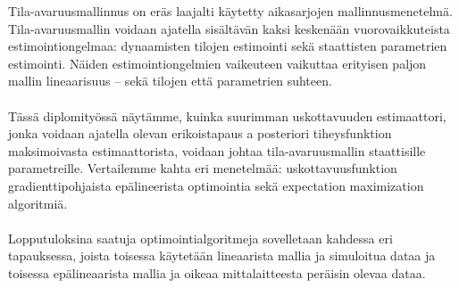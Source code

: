 \begin{abstractpage}[finnish]
Tila-avaruusmallinnus on eräs laajalti käytetty aikasarjojen mallinnusmenetelmä.
Tila-avaruusmallin voidaan ajatella sisältävän kaksi keskenään
vuorovaikkuteista estimointiongelmaa: dynaamisten tilojen estimointi
sekä staattisten parametrien estimointi. Näiden estimointiongelmien
vaikeuteen vaikuttaa erityisen paljon mallin lineaarisuus -- sekä
tilojen että parametrien suhteen.\\\\%
%
Tässä diplomityössä näytämme, kuinka 
suurimman uskottavuuden estimaattori, jonka voidaan ajatella olevan
erikoistapaus a posteriori tiheysfunktion maksimoivasta estimaattorista, 
voidaan johtaa tila-avaruusmallin staattisille parametreille.
Vertailemme kahta eri menetelmää: 
uskottavuusfunktion gradienttipohjaista epälineerista optimointia
sekä expectation maximization algoritmiä.\\\\%
%
Lopputuloksina saatuja optimointialgoritmeja sovelletaan kahdessa
eri tapauksessa, joista toisessa käytetään lineaarista
mallia ja simuloitua dataa ja toisessa epälineaarista mallia
ja oikeaa mittalaitteesta peräisin olevaa dataa.


\end{abstractpage}

%



